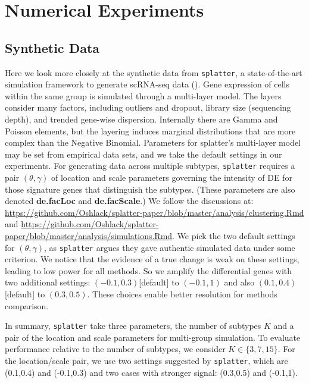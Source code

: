 \documentclass[aoas,preprint]{imsart}
\begin{document}
\clearpage

\section{Numerical Experiments}

\subsection{Synthetic Data}

Here we look more closely at the synthetic data from \verb+splatter+,
 a state-of-the-art simulation framework to generate scRNA-seq data (\cite{ref:Zappia}).
Gene expression of cells within the same group is simulated through a multi-layer model. 
The layers consider many factors, including
  outliers and dropout, library size (sequencing depth), and trended gene-wise dispersion. 
Internally there are Gamma and Poisson elements, but the layering induces marginal distributions
that are more complex than the Negative Binomial.
Parameters for splatter's multi-layer model may be set from empirical data sets, and we take the
default settings in our experiments.  For generating data across multiple subtypes, 
\verb+splatter+ requires a pair $(\theta,\gamma)$ of location and scale 
parameters governing the intensity of DE for those signature genes that distinguish the subtypes.
(These parameters are also denoted \textbf{de.facLoc} and \textbf{de.facScale}.)  
We follow  the discussions at:
\url{https://github.com/Oshlack/splatter-paper/blob/master/analysis/clustering.Rmd}
and
\url{https://github.com/Oshlack/splatter-paper/blob/master/analysis/simulations.Rmd}.
 We pick the two default settings for $(\theta,\gamma)$, 
 as \verb+splatter+ argues they gave authentic simulated data under some criterion.
We notice that the evidence of a true change  is weak on these settings,
 leading to low power for all methods. So we amplify the differential genes with two additional
settings:  $(-0.1,0.3)$[default] to $(-0.1,1)$ 
and also $(0.1,0.4)$[default] to $(0.3,0.5)$.  These choices enable better resolution for methods comparison.


In summary, \verb+splatter+ take three parameters, the number of subtypes $K$ and a
 pair of the location and scale parameters for multi-group simulation.
To evaluate performance relative to the number of subtypes,
we consider $K \in \{3,7,15\}$.
For the location/scale pair, we use two settings suggested by \verb+splatter+, 
which are (0.1,0.4) and (-0.1,0.3)  and two cases with stronger signal:
(0.3,0.5) and (-0.1,1).
\end{document}
